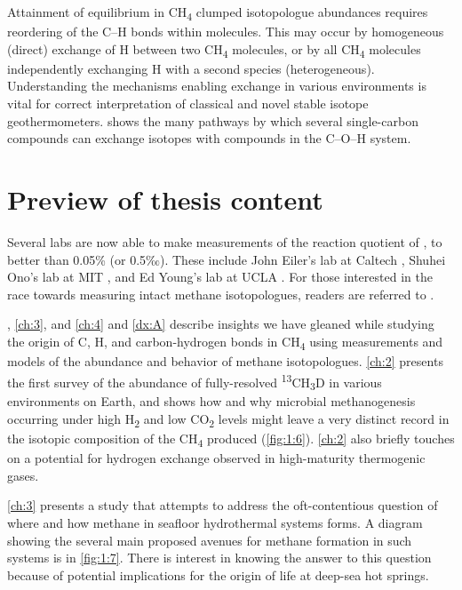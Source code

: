 

Attainment of equilibrium in CH\textsubscript{4} clumped isotopologue
abundances requires reordering of the C--H bonds within molecules. This
may occur by homogeneous (direct) exchange of H between two
CH\textsubscript{4} molecules, or by all CH\textsubscript{4} molecules
independently exchanging H with a second species (heterogeneous).
Understanding the mechanisms enabling exchange in various environments
is vital for correct interpretation of classical and novel stable
isotope geothermometers.  shows the many pathways by which
several single-carbon compounds can exchange isotopes with compounds in
the C--O--H system.

\section{Preview of thesis content}\label{preview-of-thesis-content}

Several labs are now able to make measurements of the reaction quotient
of , to better than 0.05\% (or 0.5‰). These include John
Eiler's lab at Caltech \parencite{Stolper++_2014_GCA}, Shuhei Ono's lab at MIT
\parencite{Ono++_2014_AC}, and Ed Young's lab at UCLA \parencite{Young++_2016_IJMS}. For
those interested in the race towards measuring intact methane
isotopologues, readers are referred to \textcite{Jones_2012_Earth}.

, \ref{ch:3}, and \ref{ch:4} and \autoref{dx:A} describe insights we have gleaned
while studying the origin of C, H, and carbon-hydrogen bonds in
CH\textsubscript{4} using measurements and models of the abundance and
behavior of methane isotopologues. \autoref{ch:2} presents the first survey
of the abundance of fully-resolved
\textsuperscript{13}CH\textsubscript{3}D in various environments on
Earth, and shows how and why microbial methanogenesis occurring under
high H\textsubscript{2} and low CO\textsubscript{2} levels might leave a
very distinct record in the isotopic composition of the
CH\textsubscript{4} produced (\autoref{fig:1:6}). \autoref{ch:2} also briefly touches on
a potential for hydrogen exchange observed in high-maturity thermogenic
gases.




\autoref{ch:3} presents a study that attempts to address the oft-contentious
question of where and how methane in seafloor hydrothermal systems
forms. A diagram showing the several main proposed avenues for methane
formation in such systems is in \autoref{fig:1:7}. There is interest in knowing the
answer to this question because of potential implications for the origin
of life at deep-sea hot springs.


